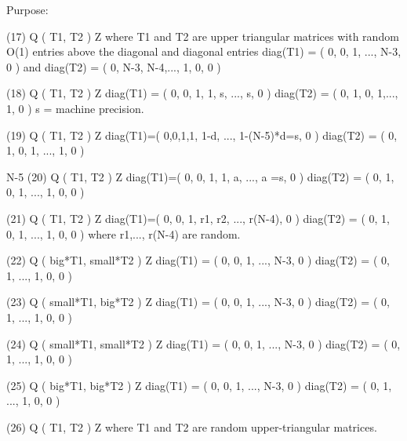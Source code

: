 \begin{DoxyParagraph}{Purpose\+: }
\begin{DoxyVerb}
 (17) Q ( T1, T2 ) Z    where T1 and T2 are upper triangular matrices
                        with random O(1) entries above the diagonal
                        and diagonal entries diag(T1) =
                        ( 0, 0, 1, ..., N-3, 0 ) and diag(T2) =
                        ( 0, N-3, N-4,..., 1, 0, 0 )

 (18) Q ( T1, T2 ) Z    diag(T1) = ( 0, 0, 1, 1, s, ..., s, 0 )
                        diag(T2) = ( 0, 1, 0, 1,..., 1, 0 )
                        s = machine precision.

 (19) Q ( T1, T2 ) Z    diag(T1)=( 0,0,1,1, 1-d, ..., 1-(N-5)*d=s, 0 )
                        diag(T2) = ( 0, 1, 0, 1, ..., 1, 0 )

                                                        N-5
 (20) Q ( T1, T2 ) Z    diag(T1)=( 0, 0, 1, 1, a, ..., a   =s, 0 )
                        diag(T2) = ( 0, 1, 0, 1, ..., 1, 0, 0 )

 (21) Q ( T1, T2 ) Z    diag(T1)=( 0, 0, 1, r1, r2, ..., r(N-4), 0 )
                        diag(T2) = ( 0, 1, 0, 1, ..., 1, 0, 0 )
                        where r1,..., r(N-4) are random.

 (22) Q ( big*T1, small*T2 ) Z    diag(T1) = ( 0, 0, 1, ..., N-3, 0 )
                                  diag(T2) = ( 0, 1, ..., 1, 0, 0 )

 (23) Q ( small*T1, big*T2 ) Z    diag(T1) = ( 0, 0, 1, ..., N-3, 0 )
                                  diag(T2) = ( 0, 1, ..., 1, 0, 0 )

 (24) Q ( small*T1, small*T2 ) Z  diag(T1) = ( 0, 0, 1, ..., N-3, 0 )
                                  diag(T2) = ( 0, 1, ..., 1, 0, 0 )

 (25) Q ( big*T1, big*T2 ) Z      diag(T1) = ( 0, 0, 1, ..., N-3, 0 )
                                  diag(T2) = ( 0, 1, ..., 1, 0, 0 )

 (26) Q ( T1, T2 ) Z     where T1 and T2 are random upper-triangular
                         matrices.\end{DoxyVerb}
 
\end{DoxyParagraph}

